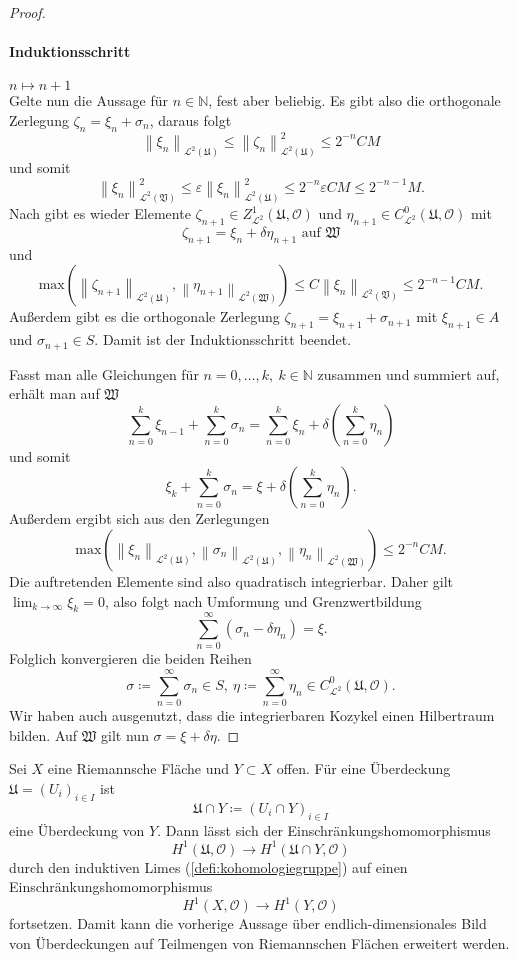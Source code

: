 \documentclass[11pt,a4paper,toc=bibliography]{scrartcl}
\theoremstyle{def}
\theoremstyle{thm}
\theoremstyle{remark}
\newcommand*{\norm}[1]{\left\lVert#1\right\rVert} %
\begin{document}
\begin{proof}
\paragraph*{Induktionsschritt} $n\mapsto n+1$\\
Gelte nun die Aussage für $n\in\mathbb{N}$, fest aber beliebig. Es gibt also die orthogonale Zerlegung $\zeta_n=\xi_n+\sigma_n$, daraus folgt
\[
\norm{\xi_n}_{\mathcal{L}^2(\mathfrak{U})}\leq \norm{\zeta_n}_{\mathcal{L}^2(\mathfrak{U})}^2\leq 2^{-n}CM
\]
und somit
\[
\norm{\xi_n}_{\mathcal{L}^2(\mathfrak{V})}^2\leq \varepsilon \norm{\xi_n}_{\mathcal{L}^2(\mathfrak{U})}^2 \leq 2^{-n}\varepsilon CM\leq
2^{-n-1}M.
\]
Nach  gibt es wieder Elemente $\zeta_{n+1}\in Z^1_{\mathcal{L}^2}(\mathfrak{U},\mathcal{O})$ und $\eta_{n+1}\in C^0_{\mathcal{L}^2}(\mathfrak{U},\mathcal{O})$ mit
\[
\zeta_{n+1}=\xi_n+\delta \eta_{n+1}\text{ auf } \mathfrak{W}
\]
und 
\[
\mathrm{max}(\norm{\zeta_{n+1}}_{\mathcal{L}^2(\mathfrak{U})},\norm{\eta_{n+1}}_{\mathcal{L}^2(\mathfrak{W})})\leq C\norm{\xi_n}_{\mathcal{L}^2(\mathfrak{V})}\leq 2^{-n-1}CM.
\]
Außerdem gibt es die orthogonale Zerlegung $\zeta_{n+1}=\xi_{n+1}+\sigma_{n+1}$ mit $\xi_{n+1}\in A$ und $\sigma_{n+1}\in S$. Damit ist der Induktionsschritt beendet.\par
Fasst man alle Gleichungen für $n=0,\ldots,k,~k\in\mathbb{N}$ zusammen und summiert auf, erhält man auf $\mathfrak{W}$
\[
\sum_{n=0}^k \xi_{n-1}+\sum_{n=0}^k \sigma_n = \sum_{n=0}^k \xi_n+\delta\left(\sum_{n=0}^k \eta_n\right)
\]
und somit 
\begin{equation*}
    \xi_{k}+\sum_{n=0}^k \sigma_n = \xi+\delta\left(\sum_{n=0}^k \eta_n\right).
\end{equation*}
Außerdem ergibt sich aus den Zerlegungen
\[
\mathrm{max}(\norm{\xi_n}_{\mathcal{L}^2(\mathfrak{U})},\norm{\sigma_n}_{\mathcal{L}^2(\mathfrak{U})},\norm{\eta_n}_{\mathcal{L}^2(\mathfrak{W})})\leq 2^{-n}CM.
\]
Die auftretenden Elemente sind also quadratisch integrierbar. Daher gilt $\lim_{k\rightarrow\infty}\xi_k=0$, also folgt nach Umformung und Grenzwertbildung
\[
\sum_{n=0}^{\infty} (\sigma_n-\delta \eta_n)=\xi.
\]
Folglich konvergieren die beiden Reihen
\[
\sigma \coloneqq \sum_{n=0}^{\infty}\sigma_n\in S,~
\eta \coloneqq \sum_{n=0}^{\infty}\eta_n\in C^0_{\mathcal{L}^2}(\mathfrak{U},\mathcal{O}).
\]
Wir haben auch ausgenutzt, dass die integrierbaren Kozykel einen Hilbertraum bilden. Auf $\mathfrak{W}$ gilt nun $\sigma = \xi +\delta\eta.$
\end{proof}

Sei $X$ eine Riemannsche Fläche und $Y\subset X$ offen. Für eine Überdeckung $\mathfrak{U}=(U_i)_{i\in I}$ ist \[\mathfrak{U}\cap Y\coloneqq (U_i\cap Y)_{i\in I}\]
eine Überdeckung von $Y$. Dann lässt sich der Einschränkungshomomorphismus 
\[
H^1(\mathfrak{U},\mathcal{O})\rightarrow H^1(\mathfrak{U}\cap Y,\mathcal{O})
\]
durch den induktiven Limes (\ref{defi:kohomologiegruppe}) auf einen Einschränkungshomomorphismus 
\[
H^1(X,\mathcal{O})\rightarrow H^1(Y,\mathcal{O})
\]
fortsetzen. Damit kann die vorherige Aussage über endlich-dimensionales Bild von Überdeckungen auf Teilmengen von Riemannschen Flächen erweitert werden.
\end{document}
